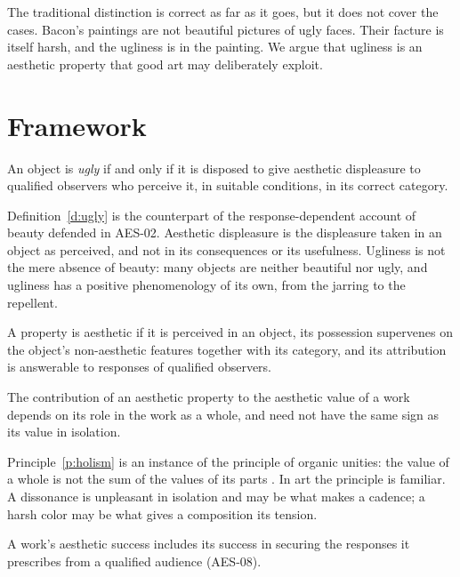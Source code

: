 \documentclass{situationist-preprint}
\begin{document}
The traditional distinction is correct as far as it goes, but it does not cover the cases. Bacon's paintings are not beautiful pictures of ugly faces. Their facture is itself harsh, and the ugliness is in the painting. We argue that ugliness is an aesthetic property that good art may deliberately exploit.

\section{Framework}

\begin{definition}[Ugliness]\label{d:ugly}
An object is \emph{ugly} if and only if it is disposed to give aesthetic displeasure to qualified observers who perceive it, in suitable conditions, in its correct category.
\end{definition}

Definition~\ref{d:ugly} is the counterpart of the response-dependent account of beauty defended in AES-02. Aesthetic displeasure is the displeasure taken in an object as perceived, and not in its consequences or its usefulness. Ugliness is not the mere absence of beauty: many objects are neither beautiful nor ugly, and ugliness has a positive phenomenology of its own, from the jarring to the repellent.

\begin{principle}\label{p:aesth}
A property is aesthetic if it is perceived in an object, its possession supervenes on the object's non-aesthetic features together with its category, and its attribution is answerable to responses of qualified observers.
\end{principle}

\begin{principle}[Holism]\label{p:holism}
The contribution of an aesthetic property to the aesthetic value of a work depends on its role in the work as a whole, and need not have the same sign as its value in isolation.
\end{principle}

Principle~\ref{p:holism} is an instance of the principle of organic unities: the value of a whole is not the sum of the values of its parts \citep{Moore1903}. In art the principle is familiar. A dissonance is unpleasant in isolation and may be what makes a cadence; a harsh color may be what gives a composition its tension.

\begin{principle}\label{p:presc}
A work's aesthetic success includes its success in securing the responses it prescribes from a qualified audience (AES-08).
\end{principle}
\end{document}
